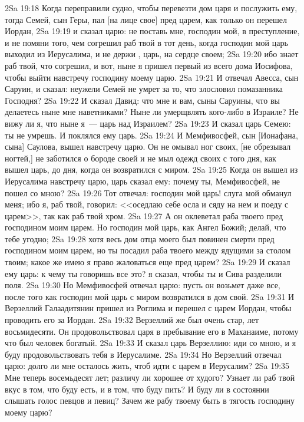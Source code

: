 \vs 2Sa 19:18 Когда переправили судно, чтобы перевезти дом царя и послужить ему, тогда Семей, сын Геры, пал [на лице свое] пред царем, как только он перешел Иордан,
\vs 2Sa 19:19 и сказал царю: не поставь мне, господин мой, в преступление, и не помяни того, чем согрешил раб твой в тот день, когда господин мой царь выходил из Иерусалима, и не держи , царь, на сердце своем;
\vs 2Sa 19:20 ибо знает раб твой, что согрешил, и вот, ныне я пришел первый из всего дома Иосифова, чтобы выйти навстречу господину моему царю.
\vs 2Sa 19:21 И отвечал Авесса, сын Саруин, и сказал: неужели Семей не умрет за то, что злословил помазанника Господня?
\vs 2Sa 19:22 И сказал Давид: что мне и вам, сыны Саруины, что вы делаетесь ныне мне наветниками? Ныне ли умерщвлять кого-либо в Израиле? Не вижу ли я, что ныне я~--- царь над Израилем?
\vs 2Sa 19:23 И сказал царь Семею: ты не умрешь. И поклялся ему царь.
\vs 2Sa 19:24 И Мемфивосфей, сын [Ионафана, сына] Саулова, вышел навстречу царю. Он не омывал ног своих, [не обрезывал ногтей,] не заботился о бороде своей и не мыл одежд своих с того дня, как вышел царь, до дня, когда он возвратился с миром.
\vs 2Sa 19:25 Когда он вышел из Иерусалима навстречу царю, царь сказал ему: почему ты, Мемфивосфей, не пошел со мною?
\vs 2Sa 19:26 Тот отвечал: господин мой царь! слуга мой обманул меня; ибо я, раб твой, говорил: <<оседлаю себе осла и сяду на нем и поеду с царем>>, так как раб твой хром.
\vs 2Sa 19:27 А он оклеветал раба твоего пред господином моим царем. Но господин мой царь, как Ангел Божий; делай, что тебе угодно;
\vs 2Sa 19:28 хотя весь дом отца моего был повинен смерти пред господином моим царем, но ты посадил раба твоего между ядущими за столом твоим; какое же имею я право жаловаться еще пред царем?
\vs 2Sa 19:29 И сказал ему царь: к чему ты говоришь все это? я сказал, чтобы ты и Сива разделили  поля.
\vs 2Sa 19:30 Но Мемфивосфей отвечал царю: пусть он возьмет даже все, после того как господин мой царь с миром возвратился в дом свой.
\vs 2Sa 19:31 И Верзеллий Галаадитянин пришел из Роглима и перешел с царем Иордан, чтобы проводить его за Иордан.
\vs 2Sa 19:32 Верзеллий же был очень стар, лет восьмидесяти. Он продовольствовал царя в пребывание его в Маханаиме, потому что был человек богатый.
\vs 2Sa 19:33 И сказал царь Верзеллию: иди со мною, и я буду продовольствовать тебя в Иерусалиме.
\vs 2Sa 19:34 Но Верзеллий отвечал царю: долго ли мне осталось жить, чтоб идти с царем в Иерусалим?
\vs 2Sa 19:35 Мне теперь восемьдесят лет; различу ли хорошее от худого? Узнает ли раб твой вкус в том, что буду есть, и в том, что буду пить? И буду ли в состоянии слышать голос певцов и певиц? Зачем же рабу твоему быть в тягость господину моему царю?

